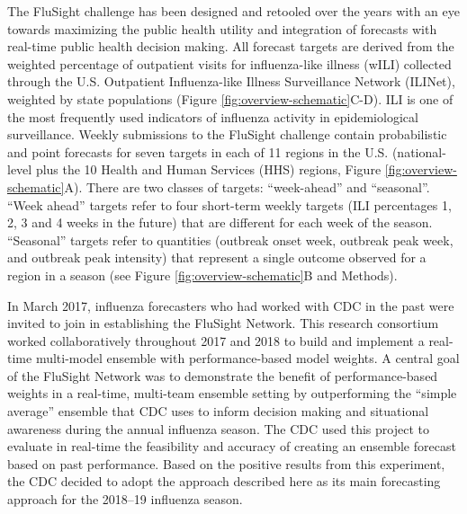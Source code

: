 \documentclass{article}\usepackage[]{graphicx}\usepackage[]{color}
\begin{document}
The FluSight challenge has been designed and retooled over the years with an eye towards maximizing the public health utility and integration of forecasts with real-time public health decision making.
All forecast targets are derived from the weighted percentage of outpatient visits for influenza-like illness (wILI) collected through the U.S. Outpatient Influenza-like Illness Surveillance Network (ILINet), weighted by state populations (Figure \ref{fig:overview-schematic}C-D).
ILI is one of the most frequently used indicators of influenza activity in epidemiological surveillance. 
Weekly submissions to the FluSight challenge contain probabilistic and point forecasts for seven targets in each of 11 regions in the U.S. (national-level plus the 10 Health and Human Services (HHS) regions, Figure \ref{fig:overview-schematic}A).
There are two classes of targets: ``week-ahead'' and ``seasonal''.
``Week ahead'' targets refer to four short-term weekly targets (ILI percentages 1, 2, 3 and 4 weeks in the future) that are different for each week of the season.
``Seasonal'' targets refer to quantities (outbreak onset week, outbreak peak week, and outbreak peak intensity) that represent a single outcome observed for a region in a season (see Figure \ref{fig:overview-schematic}B and Methods). 

In March 2017, influenza forecasters who had worked with CDC in the past were invited to join in establishing the FluSight Network.
This research consortium worked collaboratively throughout 2017 and 2018 to build and implement a real-time multi-model ensemble with performance-based model weights.
A central goal of the FluSight Network was to demonstrate the benefit of performance-based weights in a real-time, multi-team ensemble setting by outperforming the ``simple average'' ensemble that CDC uses to inform decision making and situational awareness during the annual influenza season. 
The CDC used this project to evaluate in real-time the feasibility and accuracy of creating an ensemble forecast based on past performance. 
Based on the positive results from this experiment, the CDC decided to adopt the approach described here as its main forecasting approach for the 2018–19 influenza season. 
\end{document}
